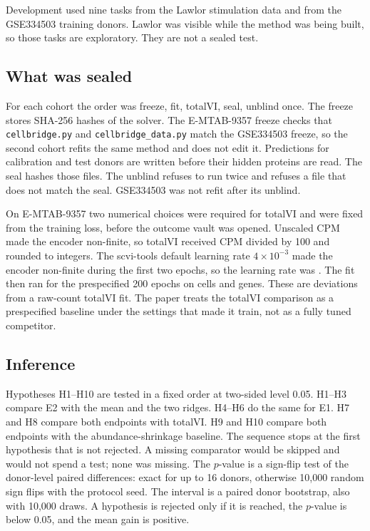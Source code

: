 \documentclass[10pt,a4paper]{article}
\begin{document}
Development used nine tasks from the Lawlor stimulation data \citep{lawlor2021} and from the GSE334503 training donors. Lawlor was visible while the method was being built, so those tasks are exploratory. They are not a sealed test.

\subsection{What was sealed}
For each cohort the order was freeze, fit, totalVI, seal, unblind once. The freeze stores SHA-256 hashes of the solver. The E-MTAB-9357 freeze checks that \texttt{cellbridge.py} and \texttt{cellbridge\_data.py} match the GSE334503 freeze, so the second cohort refits the same method and does not edit it. Predictions for calibration and test donors are written before their hidden proteins are read. The seal hashes those files. The unblind refuses to run twice and refuses a file that does not match the seal. GSE334503 was not refit after its unblind.

On E-MTAB-9357 two numerical choices were required for totalVI and were fixed from the training loss, before the outcome vault was opened. Unscaled CPM made the encoder non-finite, so totalVI received CPM divided by 100 and rounded to integers. The scvi-tools default learning rate \(4\times 10^{-3}\) made the encoder non-finite during the first two epochs, so the learning rate was \EmLr{}. The fit then ran for the prespecified 200 epochs on \EmTvCells{} cells and \EmTvGenes{} genes. These are deviations from a raw-count totalVI fit. The paper treats the totalVI comparison as a prespecified baseline under the settings that made it train, not as a fully tuned competitor.

\subsection{Inference}
Hypotheses H1--H10 are tested in a fixed order at two-sided level 0.05. H1--H3 compare E2 with the mean and the two ridges. H4--H6 do the same for E1. H7 and H8 compare both endpoints with totalVI. H9 and H10 compare both endpoints with the abundance-shrinkage baseline. The sequence stops at the first hypothesis that is not rejected. A missing comparator would be skipped and would not spend a test; none was missing. The \(p\)-value is a sign-flip test of the donor-level paired differences: exact for up to 16 donors, otherwise 10{,}000 random sign flips with the protocol seed. The interval is a paired donor bootstrap, also with 10{,}000 draws. A hypothesis is rejected only if it is reached, the \(p\)-value is below 0.05, and the mean gain is positive.
\end{document}

